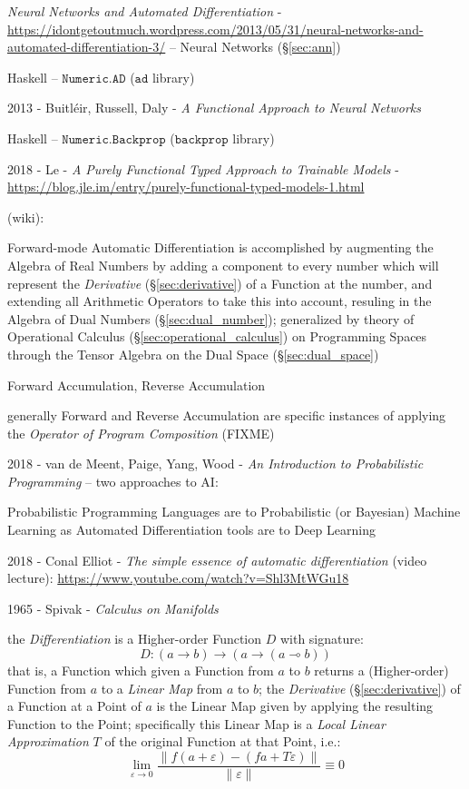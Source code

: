 \emph{Neural Networks and Automated Differentiation} -
\url{https://idontgetoutmuch.wordpress.com/2013/05/31/neural-networks-and-automated-differentiation-3/}
-- Neural Networks (\S\ref{sec:ann})

Haskell -- $\mathtt{Numeric.AD}$ ($\mathtt{ad}$ library)

2013 - Buitl\'eir, Russell, Daly -
\emph{A Functional Approach to Neural Networks}

Haskell -- $\mathtt{Numeric.Backprop}$ ($\mathtt{backprop}$ library)

2018 - Le - \emph{A Purely Functional Typed Approach to Trainable Models} -
\url{https://blog.jle.im/entry/purely-functional-typed-models-1.html}

\asterism

(wiki):

Forward-mode Automatic Differentiation is accomplished by augmenting the Algebra
of Real Numbers by adding a component to every number which will represent the
\emph{Derivative} (\S\ref{sec:derivative}) of a Function at the number, and
extending all Arithmetic Operators to take this into account, resuling in the
Algebra of Dual Numbers (\S\ref{sec:dual_number}); generalized by theory of
Operational Calculus (\S\ref{sec:operational_calculus}) on Programming Spaces
through the Tensor Algebra on the Dual Space (\S\ref{sec:dual_space})

Forward Accumulation, Reverse Accumulation

generally Forward and Reverse Accumulation are specific instances of applying
the \emph{Operator of Program Composition} (FIXME)

2018 - van de Meent, Paige, Yang, Wood -
\emph{An Introduction to Probabilistic Programming} --
two approaches to AI:

Probabilistic Programming Languages are to Probabilistic (or Bayesian) Machine
Learning as Automated Differentiation tools are to Deep Learning

\asterism

2018 - Conal Elliot - \emph{The simple essence of automatic differentiation}
(video lecture): \url{https://www.youtube.com/watch?v=Shl3MtWGu18}

1965 - Spivak - \emph{Calculus on Manifolds}

the \emph{Differentiation} is a Higher-order Function $D$ with signature:
\[
  D : (a \rightarrow b) \rightarrow (a \rightarrow (a \multimap b))
\]
that is, a Function which given a Function from $a$ to $b$ returns a
(Higher-order) Function from $a$ to a \emph{Linear Map} from $a$ to $b$; the
\emph{Derivative} (\S\ref{sec:derivative}) of a Function at a Point of $a$ is
the Linear Map given by applying the resulting Function to the Point;
specifically this Linear Map is a \emph{Local Linear Approximation} $T$ of the
original Function at that Point, i.e.:
\[
  \lim_{\varepsilon \rightarrow 0}
    \frac{\|f (a + \varepsilon) - (f a + T \varepsilon)\|}{\|\varepsilon\|}
    \equiv 0
\]

